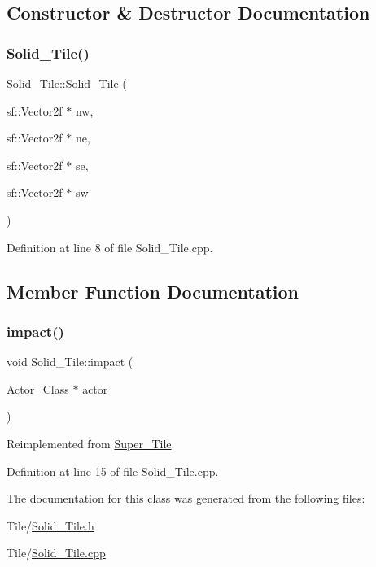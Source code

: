 \subsection{Constructor \& Destructor Documentation}
\hypertarget{class_solid___tile_a2f40382f46c06ba040266d2b37503101}{}\label{class_solid___tile_a2f40382f46c06ba040266d2b37503101} 
\subsubsection{\texorpdfstring{Solid\+\_\+\+Tile()}{Solid\_Tile()}}
{\footnotesize\ttfamily Solid\+\_\+\+Tile\+::\+Solid\+\_\+\+Tile (\begin{DoxyParamCaption}\item[{sf\+::\+Vector2f $\ast$}]{nw,  }\item[{sf\+::\+Vector2f $\ast$}]{ne,  }\item[{sf\+::\+Vector2f $\ast$}]{se,  }\item[{sf\+::\+Vector2f $\ast$}]{sw }\end{DoxyParamCaption})}



Definition at line 8 of file Solid\+\_\+\+Tile.\+cpp.



\subsection{Member Function Documentation}
\hypertarget{class_solid___tile_ada34ec00762b7df804292f40fbeecc95}{}\label{class_solid___tile_ada34ec00762b7df804292f40fbeecc95} 
\subsubsection{\texorpdfstring{impact()}{impact()}}
{\footnotesize\ttfamily void Solid\+\_\+\+Tile\+::impact (\begin{DoxyParamCaption}\item[{\hyperlink{class_actor___class}{Actor\+\_\+\+Class} $\ast$}]{actor }\end{DoxyParamCaption})\hspace{0.3cm}{\ttfamily [virtual]}}



Reimplemented from \hyperlink{class_super___tile_a7b509383d0d0ad2df0220f7dc4660823}{Super\+\_\+\+Tile}.



Definition at line 15 of file Solid\+\_\+\+Tile.\+cpp.



The documentation for this class was generated from the following files\+:\begin{DoxyCompactItemize}
\item 
Tile/\hyperlink{_solid___tile_8h}{Solid\+\_\+\+Tile.\+h}\item 
Tile/\hyperlink{_solid___tile_8cpp}{Solid\+\_\+\+Tile.\+cpp}\end{DoxyCompactItemize}
